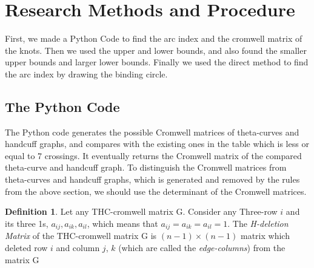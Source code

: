 \documentclass{article}
\theoremstyle{definition}
\newtheorem{defn}[thm]{Definition}
\theoremstyle{theorem}
\newtheorem{theorem}[thm]{Theorem}
\theoremstyle{proposition}
\theoremstyle{corollary}
\begin{document}

\section{Research Methods and Procedure}
First, we made a Python Code to find the arc index and the cromwell matrix of the knots. Then we used the upper and lower bounds, and also found the smaller upper bounds and larger lower bounds. Finally we used the direct method to find the arc index by drawing the binding circle.

\subsection{The Python Code}
The Python code generates the possible Cromwell matrices of theta-curves and handcuff graphs, and compares with the existing ones in the table which is less or equal to 7 crossings.
It eventually returns the Cromwell matrix of the compared theta-curve and handcuff graph.
To distinguish the Cromwell matrices from theta-curves and handcuff graphs, which is generated and removed by the rules from the above section, we should use the determinant of the Cromwell matrices.\\

\begin{defn}
    Let any THC-cromwell matrix G. Consider any Three-row $i$ and its three 1s, $a_{ij}, a_{ik}, a_{il}$, which means that $a_{ij} = a_{ik} = a_{il} = 1$. The \textit{H-deletion Matrix} of the THC-cromwell matrix G is $(n-1)\times(n-1)$ matrix which deleted row $i$ and column $j$, $k$ (which are called the \textit{edge-columns}) from the matrix G\\
\end{defn}
\end{document}
